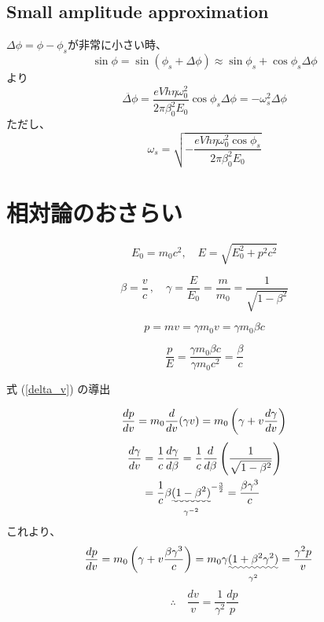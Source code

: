 \documentclass[10pt,a4paper]{ltjsarticle}
\begin{document}
\subsection{Small amplitude approximation}
$\Delta\phi = \phi - \phi_s$が非常に小さい時、
%
\begin{equation}
    \sin\phi = \sin(\phi_s+\Delta\phi) \approx \sin\phi_s + \cos\phi_s \Delta\phi
\end{equation}
%
より
%
\begin{equation}
    \ddot{\Delta\phi} = \frac{e V h \eta \omega_0^2}{2\pi \beta_0^2 E_0} \cos\phi_s \Delta\phi = - \omega_s^2 \Delta\phi
\end{equation}
%
ただし、
%
\begin{equation}
    \omega_s = \sqrt{-\frac{e V h \eta \omega_0^2 \cos\phi_s}{2\pi \beta_0^2 E_0}}
\end{equation}
%
\clearpage

\appendix
\renewcommand{\theequation}{\Alph{section}.\arabic{equation} }
\setcounter{equation}{0}

\section{相対論のおさらい}
\begin{equation}
    E_0 = m_0 c^2 ,\quad E = \sqrt{E_0^2 + p^2 c^2}
\end{equation}

\begin{equation}
    \beta = \frac{v}{c}\,,\quad \gamma = \frac{E}{E_0}=\frac{m}{m_0}=\frac{1}{\sqrt{1-\beta^2}}
\end{equation}

\begin{equation}
    p = mv = \gamma m_0 v = \gamma m_0 \beta c
\end{equation}

\begin{equation}
    \frac{p}{E} = \frac{\gamma m_0 \beta c}{\gamma m_0 c^2} = \frac{\beta}{c}
\end{equation}

式 (\ref{delta_v}) の導出

\begin{equation}
    \frac{dp}{dv} = m_0\frac{d}{dv}(\gamma v)
    = m_0 \left(\gamma + v \frac{d\gamma}{dv}\right) \notag
\end{equation}
%
\begin{align}
    \frac{d\gamma}{dv} & = \frac{1}{c}\frac{d\gamma}{d\beta}= \frac{1}{c}\frac{d}{d\beta}\left(\frac{1}{\sqrt{1-\beta^2}}\right) \notag \\
    & = \frac{1}{c} \beta \underset{\gamma^{-2}}{\uwave{(1-\beta^2)}}^{-\frac{3}{2}} = \frac{\beta \gamma^3}{c} \notag
\end{align}
%
これより、
\begin{align}
    \frac{dp}{dv} & = m_0 \left(\gamma + v \frac{\beta \gamma^3}{c}\right)
    = m_0 \gamma \underset{\gamma^2}{\uwave{(1 + \beta^2 \gamma^2)}}
    = \frac{\gamma^2 p}{v} \notag
\end{align}
%
\begin{equation}
    \therefore \quad \frac{dv}{v} = \frac{1}{\gamma^2}\frac{dp}{p}
    \label{dv_dp}
\end{equation}
\end{document}
